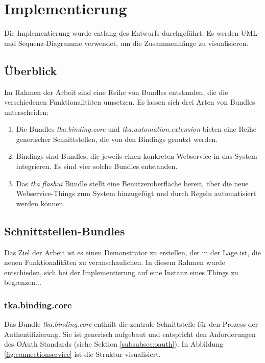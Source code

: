 \chapter{Implementierung}
Die Implementierung wurde entlang des Entwurfs durchgeführt. Es werden UML- und
Sequenz-Diagramme verwendet, um die Zusammenhänge zu visualisieren.

\section{Überblick}
Im Rahmen der Arbeit sind eine Reihe von Bundles entstanden, die die verschiedenen Funktionalitäten umsetzen. Es lassen sich drei Arten von Bundles unterscheiden:
\begin{enumerate}
\item Die Bundles \textit{tka.binding.core} und \textit{tka.automation.extension} bieten eine Reihe generischer Schnittstellen, die von den Bindings genutzt werden.
\item Bindings sind Bundles, die jeweils einen konkreten Webservice in das System integrieren. Es sind vier solche Bundles entstanden.
\item Das \textit{tka.flashui} Bundle stellt eine Benutzeroberfläche bereit, über die neue Webservice-Things zum System hinzugefügt und durch Regeln automatisiert werden können.
\end{enumerate}


\section{Schnittstellen-Bundles}
Das Ziel der Arbeit ist es einen Demonstrator zu erstellen, der in der Lage ist, die neuen Funktionalitäten zu veranschaulichen. In diesem Rahmen wurde entschieden, sich bei der Implementierung auf eine Instanz eines Things zu begrenzen...



\subsection{tka.binding.core}
\label{impl:core}
Das Bundle \textit{tka.binding.core} enthält die zentrale Schnittstelle für den Prozess der Authentifizierung. Sie ist generisch aufgebaut und entspricht den Anforderungen des OAuth Standards (siehe Sektion \ref{subsubsec:oauth}). In Abbildung \ref{fig:connectionservice} ist die Struktur visualisiert.

